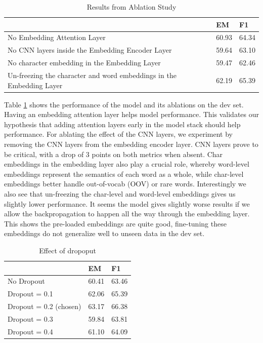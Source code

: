 \begin{table}[]
\caption{Results from Ablation Study}
\label{table:ablation}
\centering
\begin{tabular}{lll}
                                                                       & EM    & F1    \\ \hline
No Embedding Attention Layer                                           & 60.93 & 64.34 \\
No CNN layers inside the Embedding Encoder Layer                       & 59.64 & 63.10 \\
No character embedding in the Embedding Layer                          & 59.47 & 62.46 \\
Un-freezing the character and word embeddings in the Embedding Layer 	 & 62.19 & 65.39 \\ \hline

\end{tabular}
\end{table}


Table \ref{table:ablation} shows the performance of the model and its ablations on the dev set. Having an embedding attention layer helps model performance. This validates our hypothesis that adding attention layers early in the model stack should help performance. For ablating the effect of the CNN layers, we experiment by removing the CNN layers from the embedding encoder layer. CNN layers prove to be critical, with a drop of 3 points on both metrics when absent. Char embeddings in the embedding layer also play a crucial role, whereby word-level embeddings represent the semantics of each word as a whole, while char-level embeddings better handle out-of-vocab (OOV) or rare words. Interestingly we also see that un-freezing the char-level and word-level embeddings gives us slightly lower performance. It seems the model gives slightly worse results if we allow the backpropagation to happen all the way through the embedding layer. This shows the pre-loaded embeddings are quite good, fine-tuning these embeddings do not generalize well to unseen data in the dev set. 

\begin{table}[]
\caption{Effect of dropoput}
\label{table:dropoutresults}
\centering
\begin{tabular}{lll}
																	& EM    & F1    \\ \hline
No Dropout		   									& 60.41 & 63.46 \\
Dropout = 0.1    									& 62.06 & 65.39 \\ 
Dropout = 0.2 (chosen)		  			& 63.17 & 66.38 \\ 
Dropout = 0.3    									& 59.84 & 63.81 \\ 
Dropout = 0.4    									& 61.10 & 64.09 \\ \hline

\end{tabular}
\end{table}

